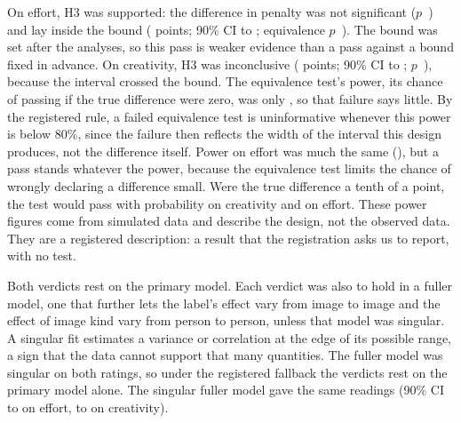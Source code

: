 On effort, H3 was supported: the difference in penalty was not significant ($p$~\SOneHThreeEffP) and lay inside the bound (\SOneHThreeEffEst{} points; 90\% CI \SOneHThreeEffLoNinety{} to \SOneHThreeEffHiNinety; equivalence $p$~\SOneHThreeEffPTost). The bound was set after the analyses, so this pass is weaker evidence than a pass against a bound fixed in advance. On creativity, H3 was inconclusive (\SOneHThreeCreatEst{} points; 90\% CI \SOneHThreeCreatLoNinety{} to \SOneHThreeCreatHiNinety; $p$~\SOneHThreeCreatP), because the interval crossed the bound. The equivalence test's power, its chance of passing if the true difference were zero, was only \SOneHThreeCreatPower, so that failure says little. By the registered rule, a failed equivalence test is uninformative whenever this power is below 80\%, since the failure then reflects the width of the interval this design produces, not the difference itself. Power on effort was much the same (\SOneHThreeEffPower), but a pass stands whatever the power, because the equivalence test limits the chance of wrongly declaring a difference small. Were the true difference a tenth of a point, the test would pass with probability \SOneHThreeCreatPowerSmall{} on creativity and \SOneHThreeEffPowerSmall{} on effort. These power figures come from simulated data and describe the design, not the observed data. They are a registered description: a result that the registration asks us to report, with no test.

Both verdicts rest on the primary model. Each verdict was also to hold in a fuller model, one that further lets the label's effect vary from image to image and the effect of image kind vary from person to person, unless that model was singular. A singular fit estimates a variance or correlation at the edge of its possible range, a sign that the data cannot support that many quantities. The fuller model was singular on both ratings, so under the registered fallback the verdicts rest on the primary model alone. The singular fuller model gave the same readings (90\% CI \SOneHThreeEffMaxLoNinety{} to \SOneHThreeEffMaxHiNinety{} on effort, \SOneHThreeCreatMaxLoNinety{} to \SOneHThreeCreatMaxHiNinety{} on creativity).

